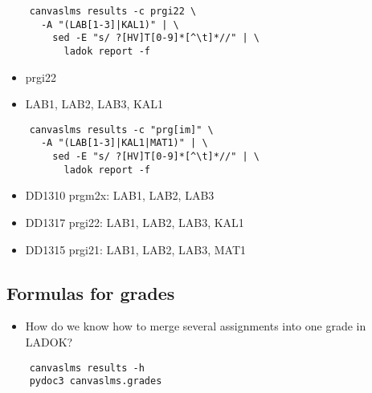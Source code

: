 \begin{frame}[fragile]
  \begin{verbatim}
    canvaslms results -c prgi22 \
      -A "(LAB[1-3]|KAL1)" | \
        sed -E "s/ ?[HV]T[0-9]*[^\t]*//" | \
          ladok report -f
  \end{verbatim}

  \begin{example}[Matching]
    \begin{itemize}
      \item prgi22
      \item LAB1, LAB2, LAB3, KAL1
    \end{itemize}
  \end{example}
\end{frame}

\begin{frame}[fragile]
  \begin{verbatim}
    canvaslms results -c "prg[im]" \
      -A "(LAB[1-3]|KAL1|MAT1)" | \
        sed -E "s/ ?[HV]T[0-9]*[^\t]*//" | \
          ladok report -f
  \end{verbatim}

  \begin{example}[Matching]
    \begin{itemize}
      \item DD1310 prgm2x: LAB1, LAB2, LAB3
      \item DD1317 prgi22: LAB1, LAB2, LAB3, KAL1
      \item DD1315 prgi21: LAB1, LAB2, LAB3, MAT1
    \end{itemize}
  \end{example}
\end{frame}

\subsection{Formulas for grades}

\begin{frame}[fragile]
  \begin{question}
    \begin{itemize}
      \item How do we know how to merge several assignments into one grade in 
        LADOK?
    \end{itemize}
  \end{question}

  \pause
  
  \begin{solution}
  \begin{verbatim}
    canvaslms results -h
    pydoc3 canvaslms.grades
  \end{verbatim}
  \end{solution}
\end{frame}

